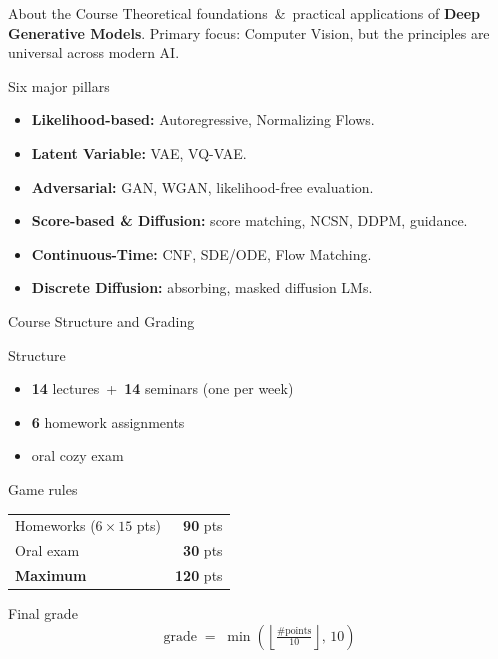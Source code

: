 \documentclass{beamer}
\renewcommand{\eqpause}{}
\begin{document}
\begin{frame}{About the Course}
    Theoretical foundations \,\&\, practical applications of \textbf{Deep Generative Models}. Primary focus: Computer Vision, but the principles are universal across modern AI.
    \eqpause
    \begin{block}{Six major pillars}
        \begin{itemize}
            \setlength{\itemsep}{0.1em}
            \item \textbf{Likelihood-based:} Autoregressive, Normalizing Flows.
            \item \textbf{Latent Variable:} VAE, VQ-VAE.
            \item \textbf{Adversarial:} GAN, WGAN, likelihood-free evaluation.
            \item \textbf{Score-based \& Diffusion:} score matching, NCSN, DDPM, guidance.
            \item \textbf{Continuous-Time:} CNF, SDE/ODE, Flow Matching.
            \item \textbf{Discrete Diffusion:} absorbing, masked diffusion LMs.
        \end{itemize}
    \end{block}
\end{frame}
\begin{frame}{Course Structure and Grading}
    \begin{block}{Structure}
        \begin{itemize}
            \item \textbf{14} lectures \,+\, \textbf{14} seminars (one per week)
            \item \textbf{6} homework assignments
            \item oral cozy exam
        \end{itemize}
    \end{block}
    \eqpause
    \begin{block}{Game rules}
        \centering
        \begin{tabular}{lr}
            Homeworks \;($6 \times 15$ pts) & \textbf{90} pts  \\
            Oral exam                       & \textbf{30} pts  \\
            \midrule
            \textbf{Maximum}                & \textbf{120} pts \\
        \end{tabular}
    \end{block}
    \eqpause
    \vspace{-0.1cm}
    \begin{block}{Final grade}
        \vspace{-0.4cm}
        $$
            \boxed{\;\text{grade} \;=\; \min\!\left(\left\lfloor \tfrac{\#\text{points}}{10} \right\rfloor,\, 10\right)\;}
        $$
    \end{block}
\end{frame}
\end{document}
